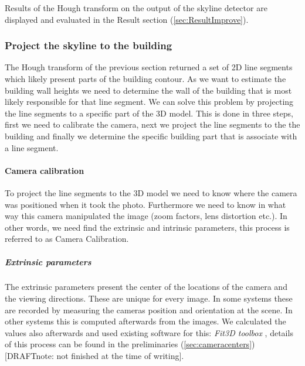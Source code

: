 	Results of the Hough transform on the output of the skyline detector are
	displayed and evaluated in the Result section (\ref{sec:ResultImprove}).

\subsubsection{Project the skyline to the building}
	The Hough transform of the previous section returned a set of 2D line
	segments which likely present parts of the building contour.  
	As we want to estimate the building wall heights we need to determine the wall
	of the building that is most likely responsible for that line segment.
	We can solve this problem by projecting the line segments to a specific
	part of the 3D model.
	This is done in three steps, first we need to calibrate the camera, next we
	project the line segments to the the building and finally we 
	determine the specific building part that is associate with a line segment.


	\paragraph{Camera calibration}
	To project the line segments to the 3D model we need to know where the
	camera was positioned when it took the photo. Furthermore we need to know
	in what way this camera manipulated the image (zoom factors, lens distortion
	etc.).  In other words, we need find the extrinsic and intrinsic parameters,
	this process is referred to as Camera Calibration.

	\subparagraph{Extrinsic parameters}
	The extrinsic parameters present the center of the locations of the camera
	and the viewing directions. These are unique for every image.
	In some systems these are recorded by measuring the cameras position and
	orientation at the scene. In other systems this is computed afterwards from the images.  
	We calculated the values also afterwards and used existing software for
	this: \emph{Fit3D toolbox} \cite{Fit3d}, details of this process can be
	found in the preliminaries (\ref{sec:cameracenters}) [DRAFTnote: not
	finished at the time of writing].\\  

